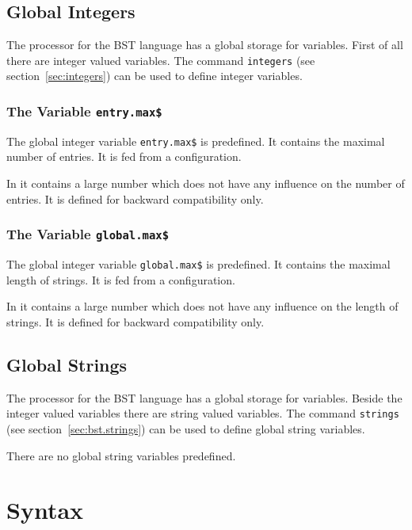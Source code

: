 \subsection{Global Integers}

The processor for the BST language has a global storage for variables.
First of all there are integer valued variables. The command
\texttt{integers} (see section~\ref{sec:integers}) can be used to
define integer variables.


\subsubsection{The Variable \texttt{entry.max\$}}%

The global integer variable \texttt{entry.max\$} is predefined. It
contains the maximal number of entries. It is fed from a
configuration.

In \ExBib{} it contains a large number which does
not have any influence on the number of entries. It is defined for
backward compatibility only.

\subsubsection{The Variable \texttt{global.max\$}}%

The global integer variable \texttt{global.max\$} is predefined. It
contains the maximal length of strings. It is fed from a
configuration.

In \ExBib{} it contains a large number which does
not have any influence on the length of strings. It is defined for
backward compatibility only.


\subsection{Global Strings}

The processor for the BST language has a global storage for variables.
Beside the integer valued variables there are string valued variables.
The command \texttt{strings} (see section~\ref{sec:bst.strings}) can be
used to define global string variables.

There are no global string variables predefined.


\section{Syntax}

